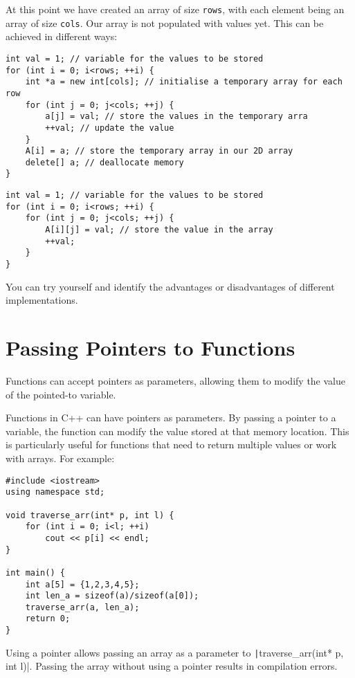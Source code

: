 \documentclass{article}
\begin{document}
At this point we have created an array of size \verb|rows|, with each element being an array of size \verb|cols|. Our array is not populated with values yet. This can be achieved in different ways:

\begin{verbatim}
int val = 1; // variable for the values to be stored
for (int i = 0; i<rows; ++i) { 
	int *a = new int[cols]; // initialise a temporary array for each row
	for (int j = 0; j<cols; ++j) {
		a[j] = val; // store the values in the temporary arra
        ++val; // update the value
    }
    A[i] = a; // store the temporary array in our 2D array
    delete[] a; // deallocate memory
}
\end{verbatim}

\begin{verbatim}    
int val = 1; // variable for the values to be stored
for (int i = 0; i<rows; ++i) { 
	for (int j = 0; j<cols; ++j) {
		A[i][j] = val; // store the value in the array
        ++val;
    }
}
\end{verbatim}

You can try yourself and identify the advantages or disadvantages of different implementations.

\section{Passing Pointers to Functions}

Functions can accept pointers as parameters, allowing them to modify the value of the pointed-to variable.

Functions in C++ can have pointers as parameters. By passing a pointer to a variable, the function can modify the value stored at that memory location. This is particularly useful for functions that need to return multiple values or work with arrays. For example:

\begin{verbatim}
#include <iostream>
using namespace std;

void traverse_arr(int* p, int l) {
    for (int i = 0; i<l; ++i)
    	cout << p[i] << endl;
}

int main() {
    int a[5] = {1,2,3,4,5};
    int len_a = sizeof(a)/sizeof(a[0]);
    traverse_arr(a, len_a);
    return 0;
}
\end{verbatim}

Using a pointer allows passing an array as a parameter to \texttt|traverse_arr(int* p, int l)|. Passing the array without using a pointer results in compilation errors.
\end{document}
